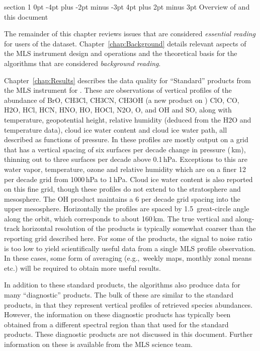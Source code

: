 \documentclass[11pt,draft]{report}
\makeatletter
\renewcommand{\section}{\@startsection%
  {section}%
  {1}%
  {0pt}%
  {-4pt plus -2pt minus -3pt}%
  {4pt plus 2pt minus 3pt}%
  {\Large\sffamily\fontseries{sb}\selectfont\flushleft\color{SectionColor}\figureversion{tabular}}}%
\makeatother
\begin{document}
\section{Overview of \thisv and this document}

The remainder of this chapter reviews issues that are considered
\emph{essential reading} for users of the \thisv dataset.
Chapter~\ref{chap:Background} details relevant aspects of the MLS
instrument design and operations and the theoretical basis for the \thisv
algorithms that are considered \emph{background reading}.

Chapter~\ref{chap:Results} describes the data quality for ``Standard''
products from the MLS instrument for \thisv.  These are observations of
vertical profiles of the abundance of BrO, CH\cs3Cl, CH\cs3CN, CH\cs3OH
(a new product on \thisv) ClO, CO, H\cs2O, HCl, HCN, HNO, HO,
HOCl, N\cs2O, O, and OH and SO, along with temperature,
geopotential height, relative humidity (deduced from the H\cs2O and
temperature data), cloud ice water content and cloud ice water path, all
described as functions of pressure.  In \thisv these profiles are mostly
output on a grid that has a vertical spacing of six surfaces per decade
change in pressure (\,km), thinning out to three
surfaces per decade above 0.1\,hPa.  Exceptions to this are water vapor,
temperature, ozone and relative humidity which are on a finer 12 per
decade grid from 1000\,hPa to 1\,hPa.  Cloud ice water content is also
reported on this fine grid, though these profiles do not extend to the
stratosphere and mesosphere.  The OH product maintains a 6 per decade
grid spacing into the upper mesosphere.  Horizontally the profiles are
spaced by 1.5\degsym\ great-circle angle along the orbit, which
corresponds to about 160\,km.  The true vertical and along-track
horizontal resolution of the products is typically somewhat coarser than
the reporting grid described here.  For some of the products, the signal
to noise ratio is too low to yield scientifically useful data from a
single MLS profile observation.  In these cases, some form of averaging
(e.g.,\ weekly maps, monthly zonal means etc.) will be required to
obtain more useful results.

In addition to these standard products, the algorithms also produce data
for many ``diagnostic'' products.  The bulk of these are similar to the
standard products, in that they represent vertical profiles of retrieved
species abundances.  However, the information on these diagnostic
products has typically been obtained from a different spectral region
than that used for the standard products.  These diagnostic products are
not discussed in this document.  Further information on these is
available from the MLS science team.
\end{document}
